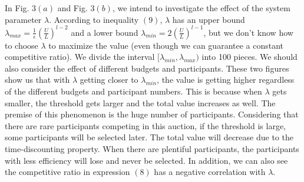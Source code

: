 \documentclass[10pt,journal,letterpaper,compsoc]{IEEEtran}
\begin{document}
In Fig. $3(a)$ and Fig. $3(b)$, we intend to investigate the effect of the system parameter $\lambda$. According to inequality $(9)$, $\lambda$ has an upper bound $\lambda_{max}= \frac{1}{\epsilon}\left(\frac{U}{L}\right)^{l-2}$ and a lower bound $\lambda_{min}=2\left(\frac{U}{L}\right)^{l-1}$, but we don't know how to choose $\lambda$ to maximize the value (even though we can  guarantee a constant competitive ratio). We divide the interval $[\lambda_{min}, \lambda_{max})$ into 100 pieces. We should also consider the effect of different budgets and participants. These two figures show us that with  $\lambda$ getting closer to $\lambda_{min}$, the value is getting higher regardless of the different budgets and participant numbers. This is because when $\lambda$ gets smaller, the threshold gets larger and the total value increases as well. The premise of this phenomenon is the huge number of participants. Considering that there are rare participants competing in this auction, if the threshold is large, some participants will be selected later. The total value will decrease due to the time-discounting property. When there are plentiful participants, the participants with less efficiency will lose and never be selected. In addition, we can also see the competitive ratio in expression $(8)$ has a negative correlation with $\lambda$.
\end{document}
